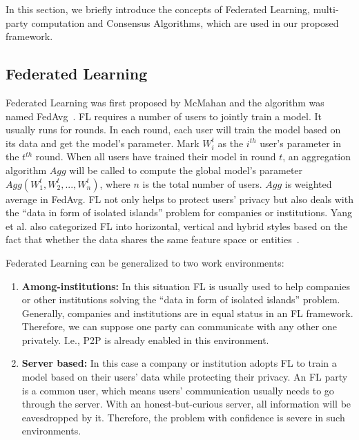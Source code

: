 In this section, we briefly introduce the concepts of Federated Learning, multi-party computation and Consensus Algorithms, which are used in our proposed framework.

\subsection{Federated Learning}
Federated Learning was first proposed by McMahan and the algorithm was named FedAvg~\cite{mcmahan2016communicationefficient}. FL requires a number of users to jointly train a model. It usually runs for rounds. In each round, each user will train the model based on its data and get the model's parameter. Mark $W_i^t$ as the $i^{th}$ user's parameter in the $t^{th}$ round. When all users have trained their model in round $t$, an aggregation algorithm $Agg$ will be called to compute the global model's parameter $Agg(W_1^t, W_2^t, ..., W_n^t)$, where $n$ is the total number of users. $Agg$ is weighted average in FedAvg. FL not only helps to protect users' privacy but also deals with the ``data in form of isolated islands'' problem for companies or institutions. Yang et al. also categorized FL into horizontal, vertical and hybrid styles based on the fact that whether the data shares the same feature space or entities~\cite{yang2019federated}. 

Federated Learning can be generalized to two work environments:

\begin{enumerate}

    \item \textbf{Among-institutions:} In this situation FL is usually used to help companies or other institutions solving the ``data in form of isolated islands'' problem. Generally, companies and institutions are in equal status in an FL framework. Therefore, we can suppose one party can communicate with any other one privately. I.e., P2P is already enabled in this environment.

    \item \textbf{Server based:} In this case a company or institution adopts FL to train a model based on their users' data while protecting their privacy. An FL party is a common user, which means users' communication usually needs to go through the server. With an honest-but-curious server, all information will be eavesdropped by it. Therefore, the problem with confidence is severe in such environments.

\end{enumerate}

